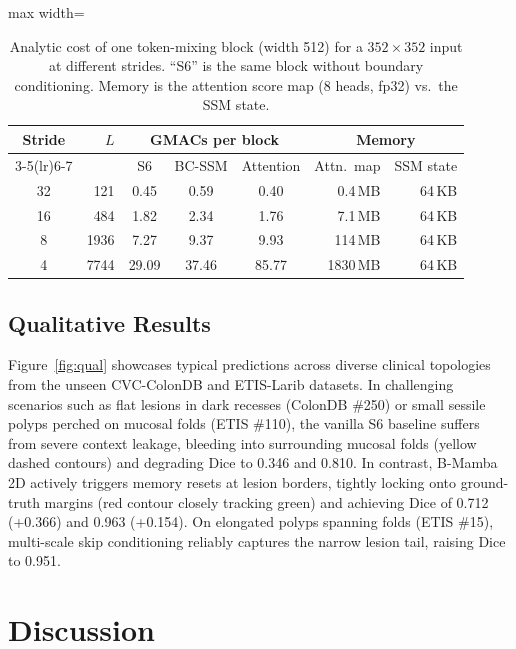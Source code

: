 \documentclass[journal]{IEEEtran}
\begin{document}
\begin{table}[t]
\centering
\caption{Analytic cost of one token-mixing block (width 512) for a $352\times352$ input at different strides. ``S6'' is the same block without boundary conditioning. Memory is the attention score map (8 heads, fp32) vs.\ the SSM state.}
\label{tab:scaling}
\begin{adjustbox}{max width=\linewidth}
\begin{tabular}{c r c c c r r}
\toprule
\multirow{2}{*}{Stride} & \multirow{2}{*}{$L$} & \multicolumn{3}{c}{GMACs per block} & \multicolumn{2}{c}{Memory} \\
\cmidrule(lr){3-5}\cmidrule(lr){6-7}
 & & S6 & BC-SSM & Attention & Attn.\ map & SSM state \\
\midrule
32 & 121   & 0.45  & 0.59  & 0.40  & 0.4\,MB  & 64\,KB \\
16 & 484   & 1.82  & 2.34  & 1.76  & 7.1\,MB  & 64\,KB \\
8  & 1936  & 7.27  & 9.37  & 9.93  & 114\,MB  & 64\,KB \\
4  & 7744  & 29.09 & 37.46 & 85.77 & 1830\,MB & 64\,KB \\
\bottomrule
\end{tabular}
\end{adjustbox}
\end{table}

\subsection{Qualitative Results}
\label{sec:qual}
Figure~\ref{fig:qual} showcases typical predictions across diverse clinical topologies from the unseen CVC-ColonDB and ETIS-Larib datasets. In challenging scenarios such as flat lesions in dark recesses (ColonDB \#250) or small sessile polyps perched on mucosal folds (ETIS \#110), the vanilla S6 baseline suffers from severe context leakage, bleeding into surrounding mucosal folds (yellow dashed contours) and degrading Dice to 0.346 and 0.810. In contrast, B-Mamba 2D actively triggers memory resets at lesion borders, tightly locking onto ground-truth margins (red contour closely tracking green) and achieving Dice of 0.712 (+0.366) and 0.963 (+0.154). On elongated polyps spanning folds (ETIS \#15), multi-scale skip conditioning reliably captures the narrow lesion tail, raising Dice to 0.951.

\section{Discussion}
\label{sec:discussion}
\end{document}
